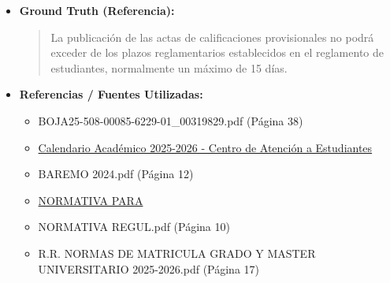 \documentclass[12pt,a4paper,oneside]{report}
\begin{document}
\begin{itemize}
\begin{itemize}
\begin{quote}
\noindent\textbf{Información Adicional}\\

\begin{itemize}
  \item El plazo de entrega de actas suele estar establecido en el Calendario Académico.
  \item La \textbf{SEVIUS} (Sistema de Evaluación y Verificación de Información Universitaria de Sevilla) y la \textbf{Secretaría Virtual} pueden ofrecer información adicional y trámites relacionados con las actas y calificaciones.
\end{itemize}

Recuerda verificar la información actualizada en los canales oficiales de la Universidad de Sevilla para asegurarte de cumplir con los plazos establecidos.
                \end{quote}
          \item \textbf{{Ground Truth (Referencia):}} \\
                \begin{quote}
La publicación de las actas de calificaciones provisionales no podrá exceder de los plazos reglamentarios establecidos en el reglamento de estudiantes, normalmente un máximo de 15 días.
                \end{quote}
          \item \textbf{{Referencias / Fuentes Utilizadas:}} \\
                \begin{itemize}
                  \item BOJA25-508-00085-6229-01\_00319829.pdf (Página 38)
                  \item \href{https://cat.us.es/sites/default/files/2025-03/calendario-academico-2025-2026-cg.pdf}{Calendario Académico 2025-2026 - Centro de Atención a Estudiantes}
                  \item BAREMO 2024.pdf (Página 12)
                  \item \href{https://geografiaehistoria.us.es/sites/geografiaehistoria/files/la-facultad/Normativa+cierre+de+actas+de+20012010\_0.pdf}{NORMATIVA PARA}
                  \item NORMATIVA REGUL.pdf (Página 10)
                  \item R.R. NORMAS DE MATRICULA GRADO Y MASTER UNIVERSITARIO 2025-2026.pdf (Página 17)
                \end{itemize}
        \end{itemize}


\end{itemize}
\end{document}
